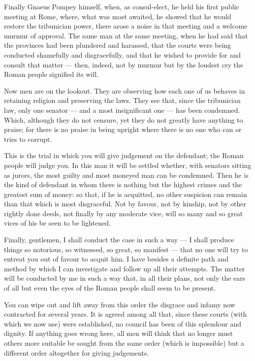  Finally Gnaeus Pompey himself, when, as consul-elect, he held his first public meeting at Rome, where, what was most awaited, he showed that he would restore the tribunician power, there arose a noise in that meeting and a welcome murmur of approval. The same man at the same meeting, when he had said that the provinces had been plundered and harassed, that the courts were being conducted shamefully and disgracefully, and that he wished to provide for and consult that matter --- then, indeed, not by murmur but by the loudest cry the Roman people signified its will.

 Now men are on the lookout. They are observing how each one of us behaves in retaining religion and preserving the laws. They see that, since the tribunician law, only one senator --- and a most insignificant one --- has been condemned. Which, although they do not censure, yet they do not greatly have anything to praise; for there is no praise in being upright where there is no one who can or tries to corrupt.

 This is the trial in which you will give judgement on the defendant; the Roman people will judge you. In this man it will be settled whether, with senators sitting as jurors, the most guilty and most moneyed man can be condemned. Then he is the kind of defendant in whom there is nothing but the highest crimes and the greatest sum of money: so that, if he is acquitted, no other suspicion can remain than that which is most disgraceful. Not by favour, not by kinship, not by other rightly done deeds, not finally by any moderate vice, will so many and so great vices of his be seen to be lightened.

 Finally, gentlemen, I shall conduct the case in such a way --- I shall produce things so notorious, so witnessed, so great, so manifest --- that no one will try to entreat you out of favour to acquit him. I have besides a definite path and method by which I can investigate and follow up all their attempts. The matter will be conducted by me in such a way that, in all their plans, not only the ears of all but even the eyes of the Roman people shall seem to be present.

 You can wipe out and lift away from this order the disgrace and infamy now contracted for several years. It is agreed among all that, since these courts (with which we now use) were established, no council has been of this splendour and dignity. If anything goes wrong here, all men will think that no longer must others more suitable be sought from the same order (which is impossible) but a different order altogether for giving judgements.

